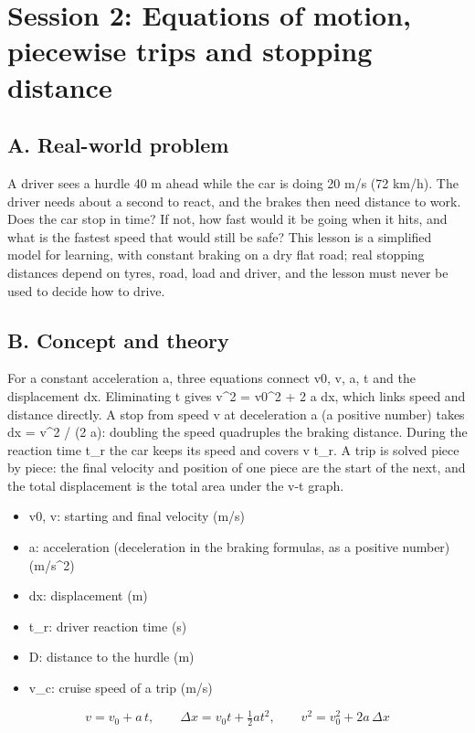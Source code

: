 \documentclass[11pt,a4paper]{article}
\begin{document}
\section{Session 2: Equations of motion, piecewise trips and stopping distance}

\subsection*{A. Real-world problem}
A driver sees a hurdle 40 m ahead while the car is doing 20 m/s (72 km/h). The driver needs about a second to react, and the brakes then need distance to work. Does the car stop in time? If not, how fast would it be going when it hits, and what is the fastest speed that would still be safe? This lesson is a simplified model for learning, with constant braking on a dry flat road; real stopping distances depend on tyres, road, load and driver, and the lesson must never be used to decide how to drive.

\subsection*{B. Concept and theory}
For a constant acceleration a, three equations connect v0, v, a, t and the displacement dx. Eliminating t gives v\textasciicircum{}2 = v0\textasciicircum{}2 + 2 a dx, which links speed and distance directly. A stop from speed v at deceleration a (a positive number) takes dx = v\textasciicircum{}2 / (2 a): doubling the speed quadruples the braking distance. During the reaction time t\_r the car keeps its speed and covers v t\_r. A trip is solved piece by piece: the final velocity and position of one piece are the start of the next, and the total displacement is the total area under the v-t graph.

\begin{itemize}[nosep]
\item v0, v: starting and final velocity (m/s)
\item a: acceleration (deceleration in the braking formulas, as a positive number) (m/s\textasciicircum{}2)
\item dx: displacement (m)
\item t\_r: driver reaction time (s)
\item D: distance to the hurdle (m)
\item v\_c: cruise speed of a trip (m/s)
\end{itemize}

\begin{equation*}
v=v_0+a\,t,\qquad \Delta x=v_0 t+\tfrac12 a t^2,\qquad v^2=v_0^2+2a\,\Delta x
\end{equation*}
\end{document}

